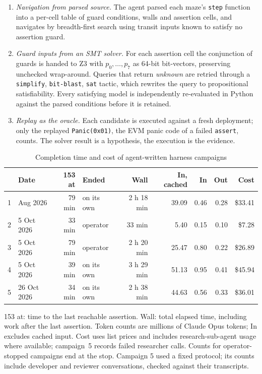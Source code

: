 \documentclass[11pt,a4paper]{article}
\newcommand{\tablenote}[1]{\par\smallskip\begin{minipage}{\linewidth}\footnotesize\raggedright #1\end{minipage}}
\begin{document}
\begin{enumerate}
  \item \emph{Navigation from parsed source.} The agent parsed each maze's \texttt{step} function into a per-cell table of guard conditions, walls and assertion cells, and navigates by breadth-first search using transit inputs known to satisfy no assertion guard.
  \item \emph{Guard inputs from an SMT solver.} For each assertion cell the conjunction of guards is handed to Z3 with $p_0,\dots,p_7$ as 64-bit bit-vectors, preserving unchecked wrap-around. Queries that return \emph{unknown} are retried through a \texttt{simplify}, \texttt{bit-blast}, \texttt{sat} tactic, which rewrites the query to propositional satisfiability. Every satisfying model is independently re-evaluated in Python against the parsed conditions before it is retained.
  \item \emph{Replay as the oracle.} Each candidate is executed against a fresh deployment; only the replayed \texttt{Panic(0x01)}, the EVM panic code of a failed \texttt{assert}, counts. The solver result is a hypothesis, the execution is the evidence.
\end{enumerate}

\begin{table}[t]
\centering\footnotesize
\caption{Completion time and cost of agent-written harness campaigns}
\label{tab:agentcost}
\setlength{\tabcolsep}{3.5pt}
\begin{tabular}{@{}llrlrrrrr@{}}
\toprule
 & Date & 153 at & Ended & Wall & In, cached & In & Out & Cost \\
\midrule
1 & Aug 2026 & 79 min & on its own & 2 h 18 min & 39.09 & 0.46 & 0.28 & \$33.41 \\
2 & 5 Oct 2026 & 33 min & operator & 33 min & 5.40 & 0.15 & 0.10 & \$7.28 \\
3 & 5 Oct 2026 & 79 min & operator & 2 h 20 min & 25.47 & 0.80 & 0.22 & \$26.89 \\
4 & 5 Oct 2026 & 39 min & on its own & 3 h 29 min & 51.13 & 0.95 & 0.41 & \$45.94 \\
5 & 26 Oct 2026 & 34 min & on its own & 2 h 38 min & 44.63 & 0.56 & 0.33 & \$36.01 \\
\bottomrule
\end{tabular}
\tablenote{153 at: time to the last reachable assertion. Wall: total elapsed time, including work after the last assertion. Token counts are millions of Claude Opus tokens; In excludes cached input. Cost uses list prices and includes research-sub-agent usage where available; campaign~5 records failed researcher calls. Counts for operator-stopped campaigns end at the stop. Campaign 5 used a fixed protocol; its counts include developer and reviewer conversations, checked against their transcripts.}
\end{table}
\end{document}
